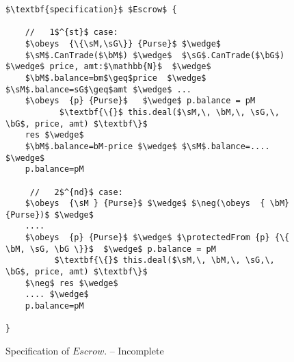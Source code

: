 \begin{figure*}[t]
\begin{lstlisting}[mathescape=true, language=Chainmail, frame=lines]
$\textbf{specification}$ $Escrow$ {
    
    //   1$^{st}$ case:
    $\obeys  {\{\sM,\sG\}} {Purse}$ $\wedge$ 
    $\sM$.CanTrade($\bM$) $\wedge$  $\sG$.CanTrade($\bG$)  $\wedge$ price, amt:$\mathbb{N}$  $\wedge$
    $\bM$.balance=bm$\geq$price  $\wedge$  $\sM$.balance=sG$\geq$amt $\wedge$ ...
    $\obeys  {p} {Purse}$   $\wedge$ p.balance = pM
           $\textbf{\{}$ this.deal($\sM,\, \bM,\, \sG,\, \bG$, price, amt) $\textbf\}$
    res $\wedge$
    $\bM$.balance=bM-price $\wedge$ $\sM$.balance=....  $\wedge$
    p.balance=pM

     //   2$^{nd}$ case:
    $\obeys  {\sM } {Purse}$ $\wedge$ $\neg(\obeys  { \bM} {Purse})$ $\wedge$ 
    ....
    $\obeys  {p} {Purse}$ $\wedge$ $\protectedFrom {p} {\{ \bM, \sG, \bG \}}$  $\wedge$ p.balance = pM
          $\textbf{\{}$ this.deal($\sM,\, \bM,\, \sG,\, \bG$, price, amt) $\textbf\}$
    $\neg$ res $\wedge$
    .... $\wedge$
    p.balance=pM
     
}

\end{lstlisting}
\caption{Specification of  $Escrow$. -- Incomplete}
\label{fig:EscrowSpec}
 \end{figure*}